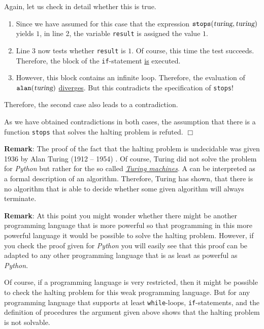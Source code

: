 \begin{enumerate}
      Again, let us check in detail whether this is true.  
      \begin{enumerate}
      \item Since we have assumed for this case that the expression 
            $\mathtt{stops}(\textsl{turing}, \textsl{turing})$ yields $1$, 
            in line 2, the variable \texttt{result} is assigned the value $1$. 
      \item Line 3 now tests whether \texttt{result} is $1$.  Of course,
            this time the test succeeds.  
            Therefore, the block of the \texttt{if}-statement \underline{is} executed.
      \item However, this block contains an infinite loop.  Therefore, the
            evaluation of $\mathtt{alan}(\textsl{turing})$ \underline{diver}g\underline{es}.
            But this contradicts the specification of \texttt{stops}!
      \end{enumerate}   
      Therefore, the second case also leads to a contradiction.
\end{enumerate}
As we have obtained contradictions in both cases, the assumption that there is a function
\texttt{stops} that solves the halting problem is refuted.
\hspace*{\fill} $\Box$
\vspace*{0.3cm}

\noindent
\textbf{Remark}:
The proof of the fact that the halting problem is undecidable was given 1936 by Alan Turing (1912 -- 1954)
\cite{turing:36}.  Of course, Turing did not solve the problem for \textsl{Python} but rather
for the so called 
\href{http://en.wikipedia.org/wiki/Indirect_proof}{\emph{Turing machines}}.  
A   
can be interpreted as a formal description of an algorithm.  
Therefore, Turing has shown, that there is no algorithm that is able to decide whether some given
algorithm will always terminate.
\vspace*{0.3cm}

\noindent
\textbf{Remark}:
At this point you might wonder whether there might be another programming language
that is more powerful so that programming in this more powerful language it would be possible to
solve the halting problem.  However, if you check the proof given for \textsl{Python} you will easily
see that this proof can be adapted to any other programming language that is as least as powerful as
\textsl{Python}. 

Of course, if a programming language is very restricted, then it might be possible to check the
halting problem for this weak programming language.  But for any programming language that supports
at least \texttt{while}-loops, \texttt{if}-statements, and the definition of procedures the argument
given above shows that the halting problem is not solvable.

